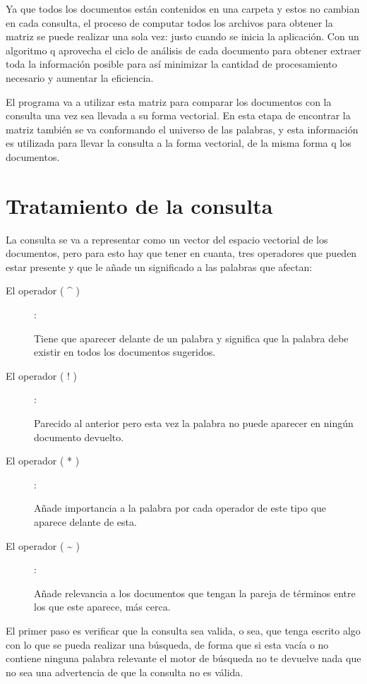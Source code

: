 \documentclass[10pt]{article}
\begin{document}
Ya que todos los documentos están contenidos en una carpeta y estos no cambian en cada consulta, el proceso de computar todos los archivos para obtener la
matriz se puede realizar una sola vez: justo cuando se inicia la aplicación. Con un algoritmo q aprovecha el ciclo de análisis de cada documento para obtener extraer toda la información posible para así minimizar la cantidad de procesamiento necesario y aumentar la eficiencia. 

El programa va a utilizar esta matriz para comparar los documentos con la consulta una vez sea llevada a su forma vectorial. En esta etapa de encontrar la matriz también se va conformando el universo de las palabras, y esta información es utilizada para llevar la consulta a la forma vectorial, de la misma forma q los documentos.

\section{Tratamiento de la consulta}
\label{sec:query}

La consulta se va a representar como un vector del espacio vectorial de los documentos, pero para esto hay que tener en cuanta, tres operadores que pueden estar presente y que le añade un significado a las palabras que afectan:
\begin{description}
	\item[El operador ( \textasciicircum{} )]: 
	
	Tiene que aparecer delante de un palabra y significa que la palabra debe existir en todos los documentos sugeridos.

	\item[El operador ( ! )]: 

	Parecido al anterior pero esta vez la palabra no puede aparecer en ningún documento devuelto.

	\item[El operador ( * )]: 
	
	Añade importancia a la palabra por cada operador de este tipo que aparece delante de esta.

	\item[El operador ( \textasciitilde{} )]: 

	Añade relevancia a los documentos que tengan la pareja de términos entre los que este aparece, más cerca. 

\end{description}
\clearpage

El primer paso es verificar que la consulta sea valida, o sea, que tenga escrito algo con lo que se pueda realizar una búsqueda, de forma que si esta vacía o no contiene ninguna palabra relevante el motor de búsqueda no te devuelve nada que no sea una advertencia de que la consulta no es válida.
\end{document}

